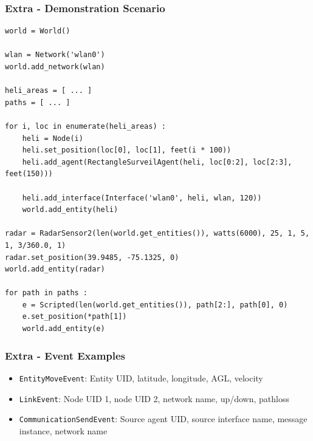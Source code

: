 \documentclass[mathserif]{beamer}
\newcommand{\backupend}{
       \addtocounter{framenumberappendix}{-\value{framenumber}}
          \addtocounter{framenumber}{\value{framenumberappendix}} 
}
\begin{document}
\begin{frame}[fragile]
    \frametitle{Extra - Demonstration Scenario}
    \tiny
    \begin{verbatim}
world = World()

wlan = Network('wlan0')
world.add_network(wlan)

heli_areas = [ ... ]
paths = [ ... ]

for i, loc in enumerate(heli_areas) :
    heli = Node(i)
    heli.set_position(loc[0], loc[1], feet(i * 100))
    heli.add_agent(RectangleSurveilAgent(heli, loc[0:2], loc[2:3], feet(150)))

    heli.add_interface(Interface('wlan0', heli, wlan, 120))
    world.add_entity(heli)

radar = RadarSensor2(len(world.get_entities()), watts(6000), 25, 1, 5, 1, 3/360.0, 1)
radar.set_position(39.9485, -75.1325, 0)
world.add_entity(radar)

for path in paths :
    e = Scripted(len(world.get_entities()), path[2:], path[0], 0)
    e.set_position(*path[1])
    world.add_entity(e)
    \end{verbatim}
\end{frame}

\frame
{
    \frametitle{Extra - Event Examples}
    \begin{itemize}
        \item \texttt{EntityMoveEvent}: Entity UID, latitude, longitude, AGL, velocity
        \item \texttt{LinkEvent}: Node UID 1, node UID 2, network name, up/down, pathloss
        \item \texttt{CommunicationSendEvent}: Source agent UID, source interface name, message instance, network name
    \end{itemize}
}

\backupend
\end{document}
